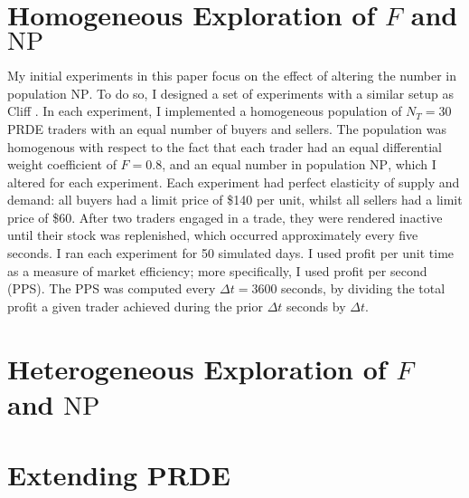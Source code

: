 \documentclass[conference]{IEEEtran}
\begin{document}
\section{Homogeneous Exploration of $F$ and $\mathrm{NP}$}

My initial experiments in this paper focus on the effect of altering the number in population $\mathrm{NP}$.
To do so, I designed a set of experiments with a similar setup as Cliff \cite{PRDE}.
In each experiment, I implemented a homogeneous population of $N_T=30$ PRDE traders with an equal number of buyers and sellers.
The population was homogenous with respect to the fact that each trader had an equal differential weight coefficient of $F=0.8$, and an equal number in population $\mathrm{NP}$, which I altered for each experiment.
Each experiment had perfect elasticity of supply and demand: all buyers had a limit price of \$140 per unit, whilst all sellers had a limit price of \$60.
After two traders engaged in a trade, they were rendered inactive until their stock was replenished, which occurred approximately every five seconds.
I ran each experiment for 50 simulated days.
I used profit per unit time as a measure of market efficiency; more specifically, I used profit per second (PPS).
The PPS was computed every $\Delta t=3600$ seconds, by dividing the total profit a given trader achieved during the prior $\Delta t$ seconds by $\Delta t$.



\section{Heterogeneous Exploration of $F$ and $\mathrm{NP}$}

\section{Extending PRDE}



\end{document}
